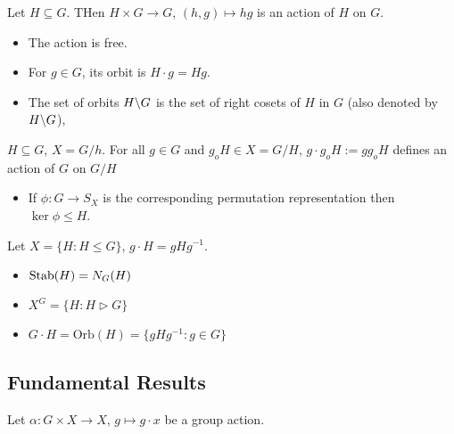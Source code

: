 \documentclass{article}
\begin{document}
\begin{example}
    Let $H\subseteq G$. THen $H\times G\rightarrow G$, $(h,g)\mapsto hg$ is an action of $H$ on $G$.
    \begin{itemize}
        \item The action is free.
        \item For $g\in G$, its orbit is $H\cdot g=Hg$.
        \item The set of orbits $H \text{\textbackslash} G$ is the set of right cosets of $H$ in $G$ (also denoted by $H\text{\textbackslash} G$),
    \end{itemize}
\end{example}
\begin{example}
    $H\subseteq G$, $X=G/h$. For all $g\in G$ and $g_o H\in X = G/H$, $g\cdot g_o H := gg_oH$ defines an action of $G$ on $G/H$
    \begin{itemize}
        \item If $\phi:G\rightarrow S_X$ is the corresponding permutation representation then $\ker\phi \le H$. 
    \end{itemize}
\end{example}
\begin{example}
    Let $X=\{H:H\le G\}$, $g\cdot H=gHg^{-1}$.
    \begin{itemize}
        \item $\operatorname{Stab}(H)=N_G(H)$
        \item $X^G=\{H:H\triangleright G\}$
        \item $G\cdot H =\text{Orb}(H) = \{gHg^{-1}:g\in G\}$
    \end{itemize}
\end{example}
\subsection{Fundamental Results}
Let $\alpha:G\times X\rightarrow X$, $g\mapsto g\cdot x$ be a group action.
\end{document}
